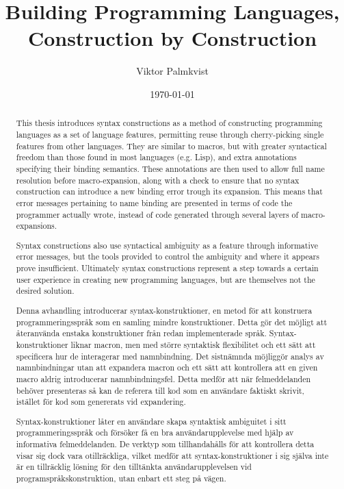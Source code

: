 \documentclass{kththesis}
\title{Building Programming Languages, Construction by Construction}
\author{Viktor Palmkvist}
\date{\today}
\begin{document}
\frontmatter

\titlepage

\begin{abstract}
This thesis introduces syntax constructions as a method of constructing programming languages as a set of language features, permitting reuse through cherry-picking single features from other languages. They are similar to macros, but with greater syntactical freedom than those found in most languages (e.g. Lisp), and extra annotations specifying their binding semantics. These annotations are then used to allow full name resolution before macro-expansion, along with a check to ensure that no syntax construction can introduce a new binding error trough its expansion. This means that error messages pertaining to name binding are presented in terms of code the programmer actually wrote, instead of code generated through several layers of macro-expansions.

Syntax constructions also use syntactical ambiguity as a feature through informative error messages, but the tools provided to control the ambiguity and where it appears prove insufficient. Ultimately syntax constructions represent a step towards a certain user experience in creating new programming languages, but are themselves not the desired solution.
\end{abstract}


\begin{otherlanguage}{swedish}
\begin{abstract}
Denna avhandling introducerar syntax-konstruktioner, en metod för att konstruera programmeringsspråk som en samling mindre konstruktioner. Detta gör det möjligt att återanvända enstaka konstruktioner från redan implementerade språk. Syntax-konstruktioner liknar macron, men med större syntaktisk flexibilitet och ett sätt att specificera hur de interagerar med namnbindning. Det sistnämnda möjliggör analys av namnbindningar utan att expandera macron och ett sätt att kontrollera att en given macro aldrig introducerar namnbindningsfel. Detta medför att när felmeddelanden behöver presenteras så kan de referera till kod som en användare faktiskt skrivit, istället för kod som genererats vid expandering.

Syntax-konstruktioner låter en användare skapa syntaktisk ambiguitet i sitt programmeringsspråk och försöker få en bra användarupplevelse med hjälp av informativa felmeddelanden. De verktyp som tillhandahålls för att kontrollera detta visar sig dock vara otillräckliga, vilket medför att syntax-konstruktioner i sig själva inte är en tillräcklig lösning för den tilltänkta användarupplevelsen vid programspråkskonstruktion, utan enbart ett steg på vägen.
\end{abstract}
\end{otherlanguage}
\end{document}

